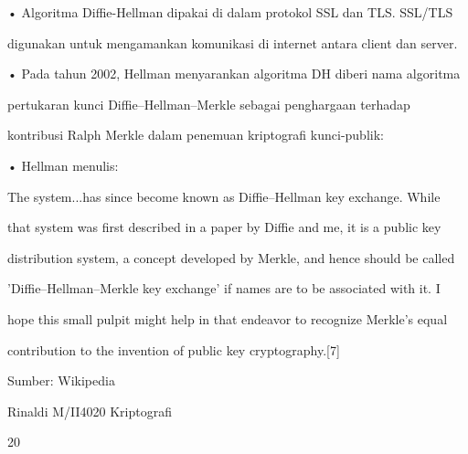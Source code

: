 \documentclass{article}
\begin{document}

• Algoritma Diffie-Hellman dipakai di dalam protokol SSL dan TLS. SSL/TLS 

digunakan untuk mengamankan komunikasi di internet antara client dan server.

• Pada tahun 2002, Hellman menyarankan algoritma DH diberi nama  algoritma 

pertukaran kunci Diffie–Hellman–Merkle sebagai penghargaan terhadap 

kontribusi Ralph Merkle dalam penemuan kriptografi kunci-publik:

• Hellman menulis:


The system...has since become known as Diffie–Hellman key exchange. While 

that system was first described in a paper by Diffie and me, it is a public key 

distribution system, a concept developed by Merkle, and hence should be called 

'Diffie–Hellman–Merkle key exchange' if names are to be associated with it. I 

hope this small pulpit might help in that endeavor to recognize Merkle's equal 

contribution to the invention of public key cryptography.[7]

Sumber: Wikipedia

Rinaldi M/II4020 Kriptografi

20
\end{document}

